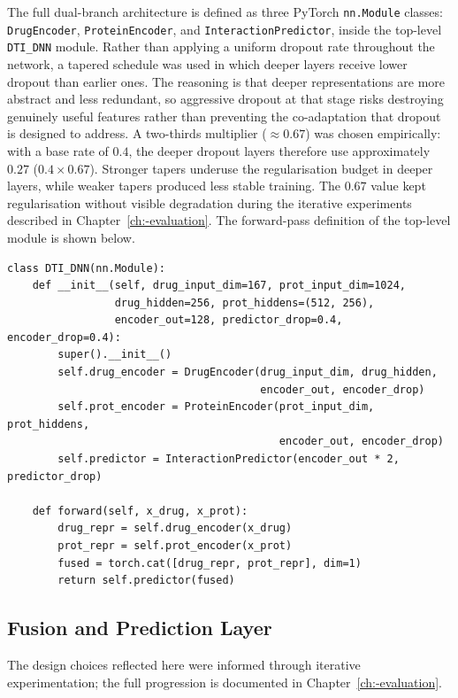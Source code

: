 The full dual-branch architecture is defined as three PyTorch \texttt{nn.Module} classes: \texttt{DrugEncoder}, \texttt{ProteinEncoder}, and \texttt{InteractionPredictor}, inside the top-level \texttt{DTI\_DNN} module.
Rather than applying a uniform dropout rate throughout the network, a tapered schedule was used in which deeper layers receive lower dropout than earlier ones.
The reasoning is that deeper representations are more abstract and less redundant, so aggressive dropout at that stage risks destroying genuinely useful features rather than preventing the co-adaptation that dropout is designed to address.
A two-thirds multiplier ($\approx 0.67$) was chosen empirically: with a base rate of $0.4$, the deeper dropout layers therefore use approximately $0.27$ ($0.4 \times 0.67$).
Stronger tapers underuse the regularisation budget in deeper layers, while weaker tapers produced less stable training.
The $0.67$ value kept regularisation without visible degradation during the iterative experiments described in Chapter~\ref{ch:-evaluation}.
The forward-pass definition of the top-level module is shown below.

\begin{lstlisting}[caption={dual-branch forward pass in DTI\_DNN}]
class DTI_DNN(nn.Module):
    def __init__(self, drug_input_dim=167, prot_input_dim=1024,
                 drug_hidden=256, prot_hiddens=(512, 256),
                 encoder_out=128, predictor_drop=0.4, encoder_drop=0.4):
        super().__init__()
        self.drug_encoder = DrugEncoder(drug_input_dim, drug_hidden,
                                        encoder_out, encoder_drop)
        self.prot_encoder = ProteinEncoder(prot_input_dim, prot_hiddens,
                                           encoder_out, encoder_drop)
        self.predictor = InteractionPredictor(encoder_out * 2, predictor_drop)

    def forward(self, x_drug, x_prot):
        drug_repr = self.drug_encoder(x_drug)
        prot_repr = self.prot_encoder(x_prot)
        fused = torch.cat([drug_repr, prot_repr], dim=1)
        return self.predictor(fused)
\end{lstlisting}

\subsection{Fusion and Prediction Layer}
The design choices reflected here were informed through iterative experimentation; the full progression is documented in Chapter~\ref{ch:-evaluation}.

